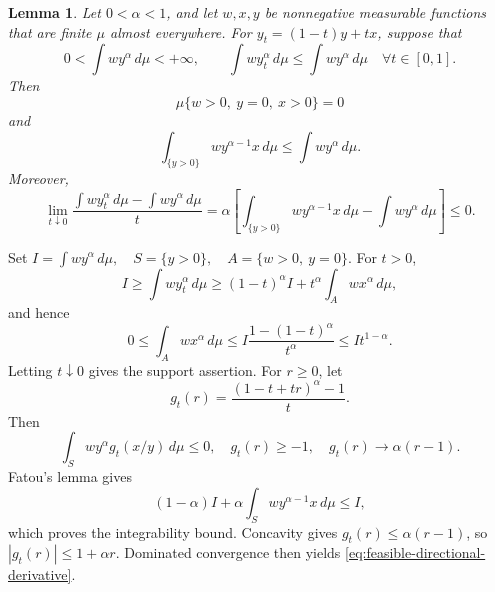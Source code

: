 \documentclass[journal,10pt,draftclsnofoot,onecolumn]{IEEEtran}
\newtheorem{lemma}{Lemma}
\begin{document}
\begin{lemma}
\label{lem:complete-feasible-directional-derivative}
Let $0<\alpha<1$, and let $w,x,y$ be nonnegative measurable functions that are finite $\mu$ almost everywhere. For $y_t=(1-t)y+tx$, suppose that
\begin{equation*}
0<\int wy^\alpha\,d\mu<+\infty, \qquad \int wy_t^\alpha\,d\mu \leq \int wy^\alpha\,d\mu \quad \forall t\in[0,1].
\end{equation*}
Then
\begin{equation*}
\mu\{w>0,\ y=0,\ x>0\}=0
\end{equation*}
and
\begin{equation*}
\int_{\{y>0\}}wy^{\alpha-1}x\,d\mu \leq \int wy^\alpha\,d\mu. 
\end{equation*}
Moreover,
\begin{equation}
\lim_{t\downarrow0} \frac{\int wy_t^\alpha\,d\mu-\int wy^\alpha\,d\mu}{t}=\alpha
\left[\int_{\{y>0\}}wy^{\alpha-1}x\,d\mu-\int wy^\alpha\,d\mu\right] \leq 0.
\label{eq:feasible-directional-derivative}
\end{equation}
\end{lemma}

\begin{IEEEproof}
Set $I=\int wy^\alpha\,d\mu, \quad S=\{y>0\}, \quad A=\{w>0,\ y=0\}.$ For $t>0$,
\begin{equation*}
I\geq \int wy_t^\alpha\,d\mu \geq (1-t)^\alpha I + t^\alpha\int_Awx^\alpha\,d\mu,
\end{equation*}
and hence
\begin{equation*}
0 \leq \int_Awx^\alpha\,d\mu \leq I\frac{1-(1-t)^\alpha}{t^\alpha} \leq It^{1-\alpha}.
\end{equation*}
Letting $t\downarrow0$ gives the support assertion. For $r\geq0$, let
\begin{equation*}
g_t(r)=\frac{(1-t+tr)^\alpha-1}{t}.
\end{equation*}
Then
\begin{equation*}
\int_Swy^\alpha g_t(x/y)\,d\mu \leq 0, \quad g_t(r)\geq-1,\quad g_t(r)\to\alpha(r-1).
\end{equation*}
Fatou's lemma gives
\begin{equation*}
(1-\alpha)I + \alpha\int_Swy^{\alpha-1}x\,d\mu \leq I,
\end{equation*}
which proves the integrability bound. Concavity gives $g_t(r)\leq\alpha(r-1)$, so $|g_t(r)|\leq1+\alpha r$. Dominated convergence then yields \eqref{eq:feasible-directional-derivative}.
\end{IEEEproof}
\end{document}
